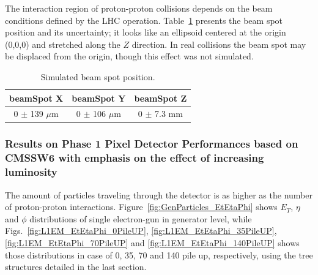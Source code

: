 The interaction region of proton-proton collisions depends on the beam conditions defined by the LHC operation. 
Table~\ref{tab:beam_spot} presents the beam spot position and its uncertainty; it looks like an ellipsoid centered at the origin (0,0,0) and stretched along the $Z$ direction. 
In real collisions the beam spot may be displaced from the origin, though this effect was not simulated.

\begin{table}[!htb]
  \centering
  \caption{Simulated beam spot position.}
  \label{tab:beam_spot}       
  \begin{tabular}{ccc} \hline
        beamSpot X & beamSpot Y &  beamSpot Z \\ \hline 
          0 $\pm$ 139 $\mu$m        & 0 $\pm$ 106 $\mu$m          & 0 $\pm$ 7.3 mm \\ \hline
  \end{tabular}
\end{table}


\subsubsection{Results on Phase 1 Pixel Detector Performances based on CMSSW6 with emphasis on the effect of increasing luminosity}


The amount of particles traveling through the detector is as higher as the number of proton-proton interactions.
Figure~\ref{fig:GenParticles_EtEtaPhi} shows $E_{T}$, $\eta$ and $\phi$ distributions of single electron-gun in
generator level, while Figs.~\ref{fig:L1EM_EtEtaPhi_0PileUP}, \ref{fig:L1EM_EtEtaPhi_35PileUP},
\ref{fig:L1EM_EtEtaPhi_70PileUP} and \ref{fig:L1EM_EtEtaPhi_140PileUP} shows those distributions in case of
0, 35, 70 and 140 pile up, respectively, using the tree structures detailed in the last section.

